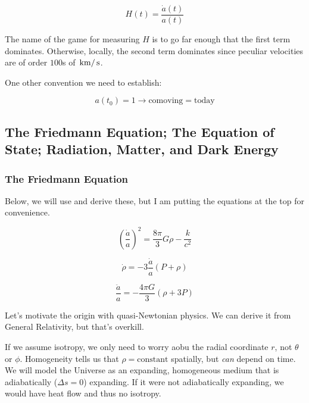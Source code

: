 \documentclass{article}
\newcommand{\unit}[1]{{\,\rm #1}}
\newcommand{\s}{\unit{s}}
\newcommand{\km}{\unit{km}}
\begin{document}
\begin{equation}
    \boxed{H(t) = \frac{\dot{a}(t)}{a(t)}}
\end{equation}

The name of the game for measuring $H$ is to go far enough that the first term dominates. Otherwise, locally, the second term dominates since peculiar velocities are of order $100$s of $\km/\s$. 

One other convention we need to establish:

\begin{equation}
    a(t_0) = 1 \rightarrow \text{comoving} = \text{today}
\end{equation}

\subsection{The Friedmann Equation; The Equation of State; Radiation, Matter, and Dark Energy}

\subsubsection{The Friedmann Equation}

Below, we will use and derive these, but I am putting the equations at the top for convenience. 

\begin{equation}
    \boxed{\left(\frac{\dot{a}}{a}\right)^2 = \frac{8\pi}{3} G \rho - \frac{k}{c^2}}
\end{equation}

\begin{equation}
    \boxed{\dot{\rho} = -3 \frac{\dot{a}}{a} \left(P + \rho\right)}
\end{equation}

\begin{equation}
    \boxed{\frac{\ddot{a}}{a} = - \frac{4\pi G}{3}\left(\rho +  3P\right)}
\end{equation}

Let's motivate the origin with quasi-Newtonian physics. We can derive it from General Relativity, but that's overkill.

If we assume isotropy, we only need to worry aobu the radial coordinate $r$, not $\theta$ or $\phi$. Homogeneity tells us that $\rho = \text{constant}$ spatially, but \textit{can} depend on time. We will model the Universe as an expanding, homogeneous medium that is adiabatically ($\Delta s =0$) expanding. If it were not adiabatically expanding, we would have heat flow and thus no isotropy. 
\end{document}

